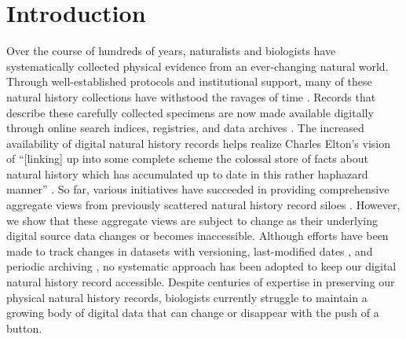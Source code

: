 


\section*{Introduction}
Over the course of hundreds of years, naturalists and biologists have systematically collected physical evidence from an ever-changing natural world. Through well-established protocols and institutional support, many of these natural history collections have withstood the ravages of time \citep{Hortal_2015,Davis_1996}. Records that describe these carefully collected specimens are now made available digitally through online search indices, registries, and data archives \citep{Page_2015}. The increased availability of digital natural history records helps realize Charles Elton's vision of ``[linking] up into some complete scheme the colossal store of facts about natural history which has accumulated up to date in this rather haphazard manner'' \citep{Elton_1927}. So far, various initiatives have succeeded in providing comprehensive aggregate views from previously scattered natural history record siloes . However, we show that these aggregate views are subject to change as their underlying digital source data changes or becomes inaccessible. Although efforts have been made to track changes in datasets with versioning, last-modified dates \citep{Wieczorek_2012,Robertson_2014}, and periodic archiving \citep{Costello_2013}, no systematic approach has been adopted to keep our digital natural history record accessible. Despite centuries of expertise in preserving our physical natural history records, biologists currently struggle to maintain a growing body of digital data that can change or disappear with the push of a button.

